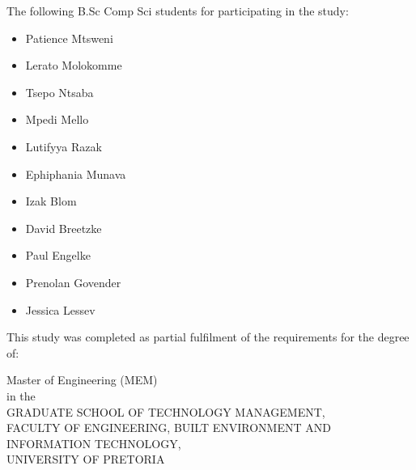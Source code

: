 \documentclass{sig-alternate-05-2015}
\begin{document}
The following B.Sc Comp Sci students for participating in the study:
\begin{itemize}
	\item Patience Mtsweni
	\item Lerato Molokomme
	\item Tsepo Ntsaba
	\item Mpedi Mello
	\item Lutifyya Razak
	\item Ephiphania Munava
	\item Izak Blom
	\item David Breetzke
	\item Paul Engelke
	\item Prenolan Govender
	\item Jessica Lessev
	\\ 
\end{itemize}
This study was completed as partial fulfilment of the requirements for the degree of: \\
\begin{center}Master of Engineering (MEM)\\
in the\\

GRADUATE SCHOOL OF TECHNOLOGY MANAGEMENT,\\
FACULTY OF ENGINEERING, BUILT ENVIRONMENT AND INFORMATION TECHNOLOGY,\\
UNIVERSITY OF PRETORIA
\end{center}


  

\end{document}
